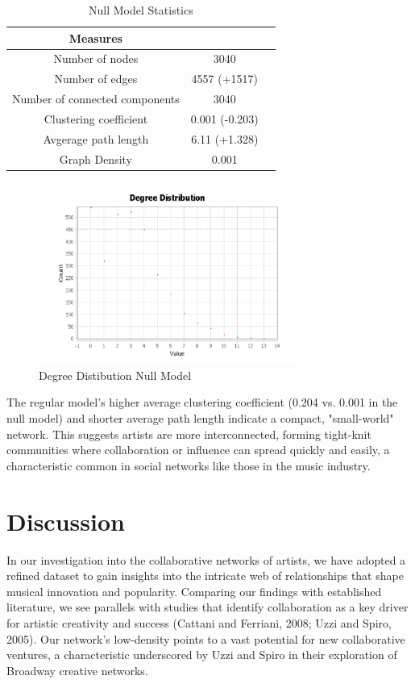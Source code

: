 \documentclass[12pt,a4paper]{article}
\begin{document}
\begin{table}[H]
  \begin{center}
\begin{tabular}{ccc}
  \hline
  Measures &   \\
  \hline
  Number of nodes &  3040\\
  Number of edges & 4557 (+1517)\\ %
  Number of connected components & 3040\\
  Clustering coefficient & 0.001 (-0.203) \\ %
  Avgerage path length & 6.11 (+1.328) \\ %
  Graph Density & 0.001\\
  \hline
  \end{tabular}
\end{center}
  \caption{Null Model Statistics}\label{tab1}
  \end{table}
\begin{figure}[H]
  \centering
  \includegraphics[width=0.75\textwidth]{degree}
  \caption{Degree Distibution Null Model}
\end{figure}
The regular model's higher average clustering coefficient (0.204 vs. 0.001 in the null model) and shorter average path length indicate a compact, "small-world" network. This suggests artists are more interconnected, forming tight-knit communities where collaboration or influence can spread quickly and easily, a characteristic common in social networks like those in the music industry.
\section{Discussion}
In our investigation into the collaborative networks of artists, we have adopted a refined dataset to gain insights into the intricate web of relationships that shape musical innovation and popularity. Comparing our findings with established literature, we see parallels with studies that identify collaboration as a key driver for artistic creativity and success (Cattani and Ferriani, 2008; Uzzi and Spiro, 2005). Our network's low-density points to a vast potential for new collaborative ventures, a characteristic underscored by Uzzi and Spiro in their exploration of Broadway creative networks.\\
\end{document}
